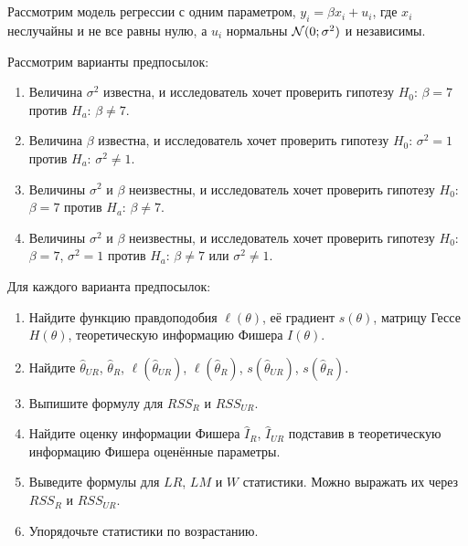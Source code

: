 \section{}

\begin{problem}
Рассмотрим модель регрессии с одним параметром, $y_i = \beta x_i + u_i$,
где $x_i$ неслучайны и не все равны нулю, а $u_i$ нормальны $\mathcal{N}(0;\sigma^2)$ и независимы.

Рассмотрим варианты предпосылок:

\begin{enumerate}
    \item Величина $\sigma^2$ известна,
    и исследователь хочет проверить гипотезу $H_0$: $\beta = 7$ против $H_a$: $\beta \neq 7$.
    \item Величина $\beta$ известна,
    и исследователь хочет проверить гипотезу $H_0$: $\sigma^2 = 1$ против $H_a$: $\sigma^2 \neq 1$.
    \item Величины $\sigma^2$ и $\beta$ неизвестны,
    и исследователь хочет проверить гипотезу $H_0$: $\beta = 7$ против $H_a$: $\beta \neq 7$.
    \item Величины $\sigma^2$ и $\beta$ неизвестны,
    и исследователь хочет проверить гипотезу $H_0$: $\beta = 7$, $\sigma^2 = 1$ против $H_a$: $\beta \neq 7$ или $\sigma^2 \neq 1$.
\end{enumerate}

Для каждого варианта предпосылок:

\begin{enumerate}
    \item Найдите функцию правдоподобия $\ell(\theta)$, её градиент $s(\theta)$,
    матрицу Гессе $H(\theta)$, теоретическую информацию Фишера $I(\theta)$.
    \item Найдите $\hat\theta_{UR}$, $\hat\theta_R$, $\ell(\hat\theta_{UR})$,
    $\ell(\hat\theta_R)$, $s(\hat\theta_{UR})$, $s(\hat\theta_R)$.
    \item Выпишите формулу для $RSS_R$ и $RSS_{UR}$.
    \item Найдите оценку информации Фишера $\hat I_R$, $\hat I_{UR}$
    подставив в теоретическую информацию Фишера оценённые параметры.
    \item Выведите формулы для $LR$, $LM$ и $W$ статистики.
    Можно выражать их через $RSS_R$ и $RSS_{UR}$.
    \item Упорядочьте статистики по возрастанию.
\end{enumerate}


\begin{sol}

\end{sol}
\end{problem}




